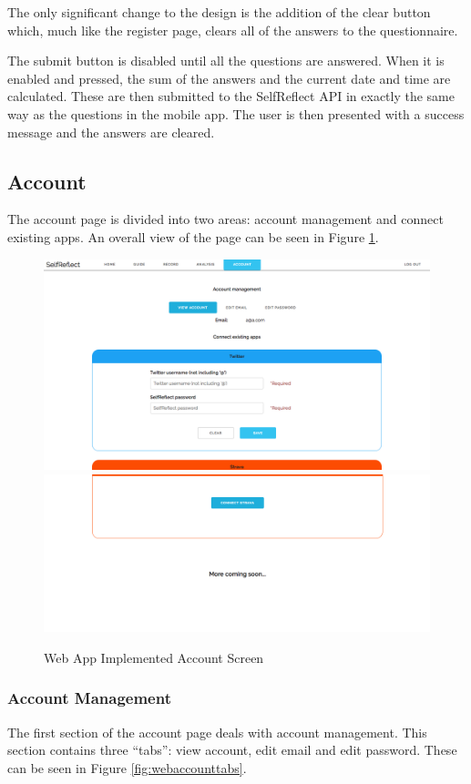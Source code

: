 \documentclass[11pt,openright,a4paper]{report}
\begin{document}
\newpage
The only significant change to the design is the addition of the clear button which, much like the register page, clears all of the answers to the questionnaire.

The submit button is disabled until all the questions are answered. When it is enabled and pressed, the sum of the answers and the current date and time are calculated. These are then submitted to the SelfReflect API in exactly the same way as the questions in the mobile app. The user is then presented with a success message and the answers are cleared.

\subsection{Account}
The account page is divided into two areas: account management and connect existing apps. An overall view of the page can be seen in Figure \ref{fig:webaccountimpl}.

\begin{figure}[ht]
\centering
\caption{Web App Implemented Account Screen}
\includegraphics[width=.75\textwidth]{i/webaccountimpltop.png}
\includegraphics[width=.75\textwidth]{i/webaccountimplbottom.png}
\label{fig:webaccountimpl}
\end{figure}

\subsubsection{Account Management}
The first section of the account page deals with account management. This section contains three \enquote{tabs}: view account, edit email and edit password. These can be seen in Figure \ref{fig:webaccounttabs}.
\end{document}
